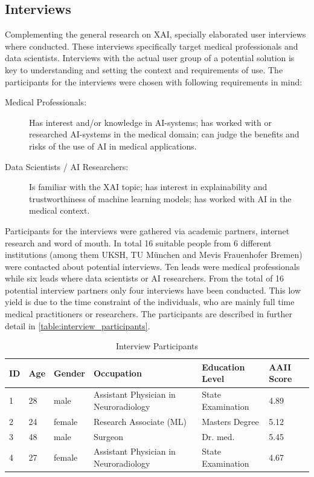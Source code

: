 \documentclass[11pt,a4paper,english]{scrreprt}
\begin{document}
\subsection{Interviews}
Complementing the general research on XAI, specially elaborated user interviews where conducted. These interviews specifically target medical professionals and data scientists. Interviews with the actual user group of a potential solution is key to understanding and setting the context and requirements of use. The participants for the interviews were chosen with following requirements in mind:
\begin{description}
    \item[Medical Professionals:] Has interest and/or knowledge in AI-systems; has worked with or researched AI-systems in the medical domain; can judge the benefits and risks of the use of AI in medical applications.
    \item[Data Scientists / AI Researchers:] Is familiar with the XAI topic; has interest in explainability and trustworthiness of machine learning models; has worked with AI in the medical context.
\end{description}
Participants for the interviews were gathered via academic partners, internet research and word of mouth. In total 16 suitable people from 6 different institutions (among them UKSH, TU München and Mevis Frauenhofer Bremen) were contacted about potential interviews. Ten leads were medical professionals while six leads where data scientists or AI researchers. From the total of 16 potential interview partners only four interviews have been conducted. This low yield is due to the time constraint of the individuals, who are mainly full time medical practitioners or researchers. The participants are described in further detail in \autoref{table:interview_participants}.

\begin{table}[htbp]
    \centering
    \begin{tabularx}{\textwidth}{ l l l X X l }
        \toprule
        ID & Age & Gender & Occupation & Education Level & AAII Score \\
        \midrule
        1 & 28 & male & Assistant Physician in Neuroradiology & State Examination & 4.89 \\ 
        2 & 24 & female & Research Associate (ML) & Masters Degree & 5.12 \\ 
        3 & 48 & male & Surgeon & Dr. med. & 5.45 \\ 
        4 & 27 & female & Assistant Physician in Neuroradiology & State Examination & 4.67 \\ 
        \bottomrule
    \end{tabularx}
    \caption{Interview Participants}
    \label{table:interview_participants}
\end{table}
\end{document}

